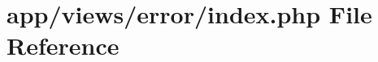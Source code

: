 \hypertarget{app_2views_2error_2index_8php}{}\section{app/views/error/index.php File Reference}
\label{app_2views_2error_2index_8php}
